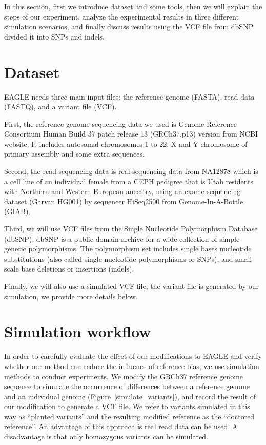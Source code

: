 \hspace{24pt}
In this section, first we introduce dataset and some tools, then we will explain the steps of our experiment, analyze the experimental results in three different simulation scenarios, and finally discuss results using the VCF file from dbSNP divided it into SNPs and indels.

\section{Dataset}
EAGLE needs three main input files: the reference genome (FASTA), read data (FASTQ), and a variant file (VCF). 

First, the reference genome sequencing data we used is Genome Reference Consortium Human Build 37 patch release 13 (GRCh37.p13) version from NCBI website.  It includes autosomal chromosomes 1 to 22, X and Y chromosome of primary assembly and some extra sequences.

Second, the read sequencing data is real sequencing data from NA12878 which is a cell line of an individual female from a CEPH pedigree that is Utah residents with Northern and Western European ancestry, using an exome sequencing dataset (Garvan HG001) by sequencer HiSeq2500 from Genome-In-A-Bottle (GIAB).

Third, we will use VCF files from the Single Nucleotide Polymorphism Database (dbSNP). dbSNP is a public domain archive for a wide collection of simple genetic polymorphisms. The polymorphism set includes single bases nucleotide substitutions (also called single nucleotide polymorphisms or SNPs), and small-scale base deletions or insertions (indels).

Finally, we will also use a simulated VCF file, the variant file is generated by our simulation, we provide more details below.

\section{Simulation workflow}
In order to carefully evaluate the effect of our modifications to EAGLE and verify whether our method can reduce the influence of reference bias, we use simulation methods to conduct experiments.  We modify the GRCh37 reference genome sequence to simulate the occurrence of differences between a reference genome and an individual genome (Figure~\ref{simulate_variants}), and record the result of our modification to generate a VCF file.  We refer to variants simulated in this way as ``planted variants'' and the resulting modified reference as the ``doctored reference''.  An advantage of this approach is real read data can be used.  A disadvantage is that only homozygous variants can be simulated.

